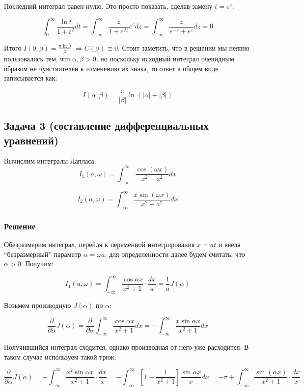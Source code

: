 \documentclass[a4paper,12pt]{article}
\begin{document}
\noindent
Последний интеграл равен нулю. Это просто показать, сделав замену $t=e^{z}$:

\[
\int_{0}^{\infty}\frac{\ln t}{1+t^{2}}dt=\int_{-\infty}^{\infty}\frac{z}{1+e^{2z}}e^{z}dz=\int_{-\infty}^{\infty}\frac{z}{e^{-z}+e^{z}}dz=0
\]

\noindent
Итого $I(0,\beta)=\frac{\pi\ln\beta}{\beta}$ $\Rightarrow C(\beta)\equiv0$.
Стоит заметить, что в решении мы неявно пользовались тем, что $\alpha,\beta>0$;
но поскольку исходный интеграл очевидным образом не чувствителен к
изменению их знака, то ответ в общем виде записывается как:

\[
I\left(\alpha,\beta\right)=\frac{\pi}{|\beta|}\ln(|\alpha|+|\beta|)
\]



\subsection*{Задача 3 (составление дифференциальных уравнений)}

Вычислим интегралы Лапласа:
\[
I_{1}(a,\omega)=\int_{-\infty}^{\infty}\frac{\cos(\omega x)}{x^{2}+a^{2}}dx
\]


\[
I_{2}(a,\omega)=\int_{-\infty}^{\infty}\frac{x\sin(\omega x)}{x^{2}+a^{2}}dx
\]



\subsubsection*{Решение}

Обезразмерим интеграл, перейдя к переменной интегрирования $x=at$
и введя ``безразмерный'' параметр $\alpha=\omega a$; для определенности
далее будем считать, что $\alpha>0$. Получим:

\[
I_{1}\left(a,\omega\right)=\int_{-\infty}^{\infty}\frac{\cos\alpha x}{x^{2}+1}\cdot\frac{dx}{a}=\frac{1}{a}J(\alpha)
\]

\noindent
Возьмем производную $J(\alpha)$ по $\alpha$:

\[
\frac{\partial}{\partial\alpha}J(\alpha)=\frac{\partial}{\partial\alpha}\int_{-\infty}^{\infty}\frac{\cos\alpha x}{x^{2}+1}dx=-\int_{-\infty}^{\infty}\frac{x\sin\alpha x}{x^{2}+1}dx
\]

\noindent
Получившийся интеграл сходится, однако производная от него уже расходится.
В таком случае используем такой трюк:

\[
\frac{\partial}{\partial\alpha}J(\alpha)=-\int_{-\infty}^{\infty}\frac{x^{2}\sin\alpha x}{x^{2}+1}\cdot\frac{dx}{x}=-\int_{-\infty}^{\infty}\left[1-\frac{1}{x^{2}+1}\right]\frac{\sin\alpha x}{x}dx=-\pi+\int_{-\infty}^{\infty}\frac{\sin(\alpha x)}{x^{2}+1}\cdot\frac{dx}{x}
\]
\end{document}

